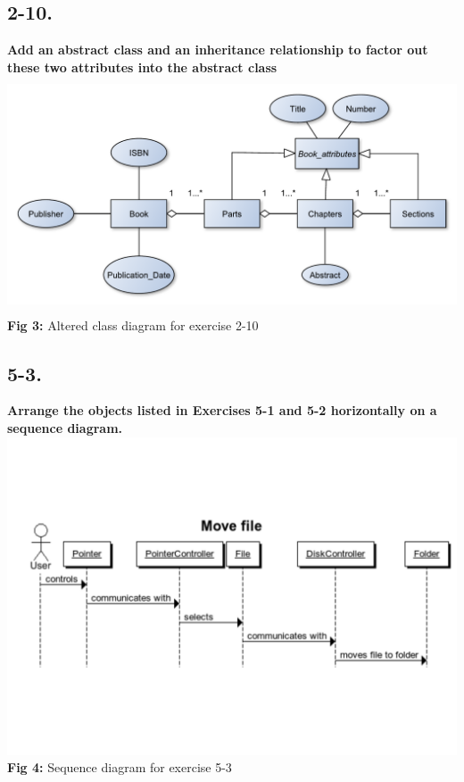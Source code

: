 \documentclass[12pt]{article}
\begin{document}
\subsection{2-10.}
\textbf{Add an abstract class and an inheritance relationship to factor out these two attributes into the abstract class}\\

\includegraphics[height=70mm]{2-10}\\
\textbf{Fig 3:} Altered class diagram for exercise 2-10










\newpage
\subsection{5-3.}
\textbf{Arrange the objects listed in Exercises 5-1 and 5-2 horizontally on a sequence diagram.}\\
\includegraphics[scale=0.5]{5-3}\\
\textbf{Fig 4:} Sequence diagram for exercise 5-3
\end{document}
